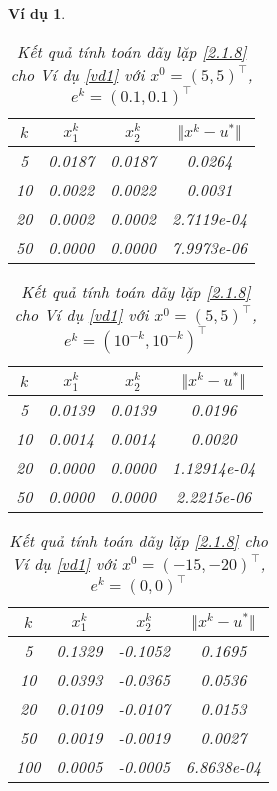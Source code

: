 \documentclass[14pt, oneside,A4paper]{book}
\theoremstyle{plain}
\newtheorem{vd}[theorem]{\bf Ví dụ}
\begin{document}
\begin{vd}
 
\begin{table}[ht]
	\centering
	\begin{tabular}{|c|c|c|c|}			
\hline 
$k$ & $x_1^k$ & $x_2^k$ & $\Vert x^ {k}- u^{*} \Vert$\\ 
\hline 
5 & 0.0187 & 0.0187 & 0.0264 \\ 
\hline 
10 & 0.0022 & 0.0022 & 0.0031 \\ 
\hline 
20 & 0.0002 & 0.0002 & 2.7119e-04 \\ 
\hline 
50 & 0.0000 & 0.0000 & 7.9973e-06\\
\hline
\end{tabular}
\caption{Kết quả tính toán dãy lặp \eqref{2.1.8} cho Ví dụ \ref{vd1} với $x^0= (5, 5)^\top$, $e^{k}=(0.1, 0.1)^\top$}
\label{B22}
	\end{table}

\newpage

	\begin{table}[ht!]
	\centering
			\begin{tabular}{|c|c|c|c|}
\hline 
$k$ & $x_1^k$ & $x_2^k$ & $\Vert x^ {k}- u^{*} \Vert$\\ 
\hline 
5 & 0.0139 & 0.0139 & 0.0196 \\ 
\hline 
10 & 0.0014 & 0.0014 & 0.0020 \\ 
\hline 
20 & 0.0000 & 0.0000 & 1.12914e-04 \\ 
\hline 
50 & 0.0000 & 0.0000 & 2.2215e-06\\
\hline
\end{tabular}
	 \caption{Kết quả tính toán dãy lặp \eqref{2.1.8} cho Ví dụ \ref{vd1} với $x^0= (5, 5)^\top $,  $e^{k}=(10^{-k},10^{-k})^\top $}
\label{B23}
\end{table}


	\begin{table}[ht!]
	\centering
\begin{tabular}{|c|c|c|c|}
\hline 
$k$ & $x_1^k$ & $x_2^k$ & $\Vert x^ {k}- u^{*} \Vert$\\ 
\hline 
5 & 0.1329 & -0.1052 & 0.1695 \\ 
\hline 
10 & 0.0393 & -0.0365 & 0.0536  \\ 
\hline 
20 & 0.0109 & -0.0107 & 0.0153 \\ 
\hline 
50 & 0.0019 & -0.0019 & 0.0027\\ 
\hline 
100 & 0.0005 & -0.0005 & 6.8638e-04\\ 
\hline 
\end{tabular}
\caption{Kết quả tính toán dãy lặp \eqref{2.1.8} cho Ví dụ \ref{vd1} với $x^{0}= (-15, -20)^{\top} $,  $e^{k}=(0,0)^\top$}
\label{B24}
\end{table}


\end{vd}
\end{document}
